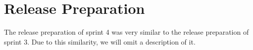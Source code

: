 \section{Release Preparation}
The release preparation of sprint 4 was very similar to the release preparation of sprint 3. Due to this similarity, we will omit a description of it.
